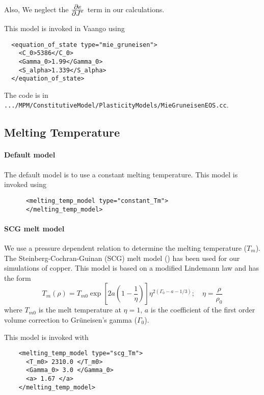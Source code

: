 Also,
\Beq
\Eeq
We neglect the $\frac{\displaystyle\partial e}{\displaystyle\partial J^e}$ term in our calculations.

This model is invoked in Vaango using
\lstset{language=XML}
\begin{lstlisting}
  <equation_of_state type="mie_gruneisen">
    <C_0>5386</C_0>
    <Gamma_0>1.99</Gamma_0>
    <S_alpha>1.339</S_alpha>
  </equation_of_state>
\end{lstlisting}
The code is in \verb|.../MPM/ConstitutiveModel/PlasticityModels/MieGruneisenEOS.cc|.

\subsection{Melting Temperature}
  \paragraph{Default model}
  The default model is to use a constant melting temperature.  This model
  is invoked using
  \lstset{language=XML}
  \begin{lstlisting}  
      <melting_temp_model type="constant_Tm">
      </melting_temp_model>
  \end{lstlisting}  
  
  \paragraph{SCG melt model}
  We use a pressure dependent relation to determine the melting 
  temperature ($T_m$).  The Steinberg-Cochran-Guinan (SCG) melt model 
  (\cite{Steinberg1980}) has been used for our simulations of copper.  
  This model is based on a modified Lindemann law and has the form
  \begin{equation} \label{eq:TmSCG}
    T_m(\rho) = T_{m0} \exp\left[2a\left(1-\frac{1}{\eta}\right)\right]
              \eta^{2(\Gamma_0-a-1/3)}; \quad
    \eta = \frac{\rho}{\rho_0}
  \end{equation}
  where $T_{m0}$ is the melt temperature at $\eta = 1$, 
  $a$ is the coefficient of the first order volume correction to 
  Gr{\"u}neisen's gamma ($\Gamma_0$).  

  This model is invoked with
  \lstset{language=XML}
  \begin{lstlisting}
    <melting_temp_model type="scg_Tm">
      <T_m0> 2310.0 </T_m0>
      <Gamma_0> 3.0 </Gamma_0>
      <a> 1.67 </a>
    </melting_temp_model>
  \end{lstlisting}

